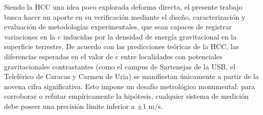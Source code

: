 




Siendo la \ac{HCC} una idea poco explorada deforma directa,  %
el presente trabajo busca hacer un aporte en su verificación mediante el diseño, caracterización y evaluación de metodologías experimentales, que sean capaces de registrar variaciones en la \ac{c} inducidas por la densidad de energía gravitacional en la superficie terrestre. De acuerdo con las predicciones teóricas de la \ac{HCC}, las diferencias esperadas en el valor de c entre localidades con potenciales gravitacionales contrastantes (como el campus de Sartenejas de la \ac{USB}, el Teleférico de Caracas y Carmen de Uria) se manifiestan únicamente a partir de la novena cifra significativa. Esto impone un desafío metrológico monumental: para corroborar o refutar empíricamente la hipótesis, cualquier sistema de medición debe poseer una precisión límite inferior a $\pm 1$ m/s. 

